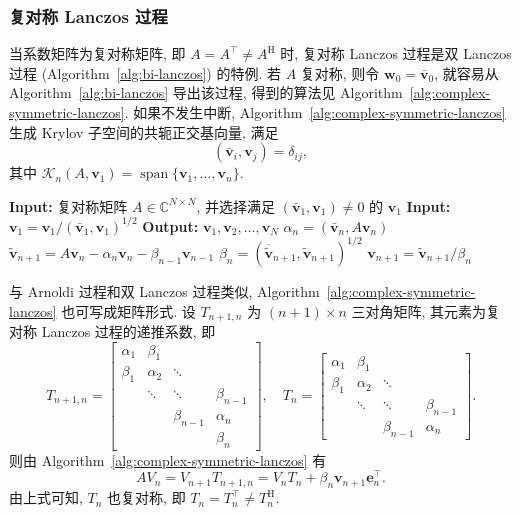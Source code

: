 \subsubsection{{复对称 Lanczos 过程}}\label{subsec:complex-symmetric-lanczos}
{当系数矩阵为复对称矩阵, 即 $A=A^\top\ne A^{\mathrm H}$ 时, 复对称 Lanczos 过程是双 Lanczos 过程 (Algorithm~\ref{alg:bi-lanczos}) 的特例. 若 $A$ 复对称, 则令 $\bm w_0=\bar{\bm v}_0$, 就容易从 Algorithm~\ref{alg:bi-lanczos} 导出该过程, 得到的算法见 Algorithm~\ref{alg:complex-symmetric-lanczos}.}
{如果不发生中断, Algorithm~\ref{alg:complex-symmetric-lanczos} 生成 Krylov 子空间的共轭正交基向量, 满足}
\[(\bar{\bm v}_i,\bm v_j)=\delta_{ij},\]
{其中 $\mathcal K_n(A,\bm v_1)=\operatorname{span}\{\bm v_1,\ldots,\bm v_n\}$.}
\begin{algorithm}[H]\caption{{复对称 Lanczos 过程 (注意: $(\bar{\bm a},\bm b)=\bm a^\top\bm b$)}}\label{alg:complex-symmetric-lanczos}
\begin{algorithmic}[1]
\Statex\textbf{Input:} {复对称矩阵 $A\in\mathbb C^{N\times N}$, 并选择满足 $(\bar{\bm v}_1,\bm v_1)\ne0$ 的 $\bm v_1$}
\Statex\textbf{Input:} $\bm v_1=\bm v_1/(\bar{\bm v}_1,\bm v_1)^{1/2}$
\Statex\textbf{Output:} $\bm v_1,\bm v_2,\ldots,\bm v_N$
\State $\alpha_n=(\bar{\bm v}_n,A\bm v_n)$
\State $\tilde{\bm v}_{n+1}=A\bm v_n-\alpha_n\bm v_n-\beta_{n-1}\bm v_{n-1}$
\State $\beta_n=(\overline{\tilde{\bm v}}_{n+1},\tilde{\bm v}_{n+1})^{1/2}$
\State $\bm v_{n+1}=\tilde{\bm v}_{n+1}/\beta_n$
\EndFor
\end{algorithmic}\end{algorithm}
{与 Arnoldi 过程和双 Lanczos 过程类似, Algorithm~\ref{alg:complex-symmetric-lanczos} 也可写成矩阵形式. 设 $T_{n+1,n}$ 为 $(n+1)\times n$ 三对角矩阵, 其元素为复对称 Lanczos 过程的递推系数, 即}
\[
T_{n+1,n}=\begin{bmatrix}\alpha_1&\beta_1&&\\\beta_1&\alpha_2&\ddots&\\&\ddots&\ddots&\beta_{n-1}\\&&\beta_{n-1}&\alpha_n\\&&&\beta_n\end{bmatrix},\quad
T_n=\begin{bmatrix}\alpha_1&\beta_1&&\\\beta_1&\alpha_2&\ddots&\\&\ddots&\ddots&\beta_{n-1}\\&&\beta_{n-1}&\alpha_n\end{bmatrix}.
\]
{则由 Algorithm~\ref{alg:complex-symmetric-lanczos} 有}
\begin{equation}\label{eq:complex-lanczos-matrix-relation}
AV_n=V_{n+1}T_{n+1,n}=V_nT_n+\beta_n\bm v_{n+1}\bm e_n^\top.
\end{equation}
{由上式可知, $T_n$ 也复对称, 即 $T_n=T_n^\top\ne T_n^{\mathrm H}$.}
